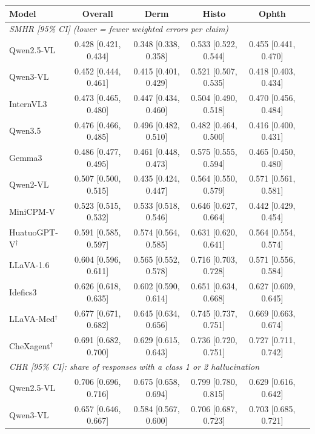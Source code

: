\begin{table}[t]
\centering
\scriptsize
\begin{tabular}{lccccc}
\toprule
Model & Overall & Derm & Histo & Ophth \\
\midrule
\multicolumn{5}{l}{\textit{SMHR [95\% CI] (lower = fewer weighted errors per claim)}} \\
\midrule
Qwen2.5-VL & 0.428 [0.421, 0.434] & 0.348 [0.338, 0.358] & 0.533 [0.522, 0.544] & 0.455 [0.441, 0.470] \\
Qwen3-VL & 0.452 [0.444, 0.461] & 0.415 [0.401, 0.429] & 0.521 [0.507, 0.535] & 0.418 [0.403, 0.434] \\
InternVL3 & 0.473 [0.465, 0.480] & 0.447 [0.434, 0.460] & 0.504 [0.490, 0.518] & 0.470 [0.456, 0.484] \\
Qwen3.5 & 0.476 [0.466, 0.485] & 0.496 [0.482, 0.510] & 0.482 [0.464, 0.500] & 0.416 [0.400, 0.431] \\
Gemma3 & 0.486 [0.477, 0.495] & 0.461 [0.448, 0.473] & 0.575 [0.555, 0.594] & 0.465 [0.450, 0.480] \\
Qwen2-VL & 0.507 [0.500, 0.515] & 0.435 [0.424, 0.447] & 0.564 [0.550, 0.579] & 0.571 [0.561, 0.581] \\
MiniCPM-V & 0.523 [0.515, 0.532] & 0.533 [0.518, 0.546] & 0.646 [0.627, 0.664] & 0.442 [0.429, 0.454] \\
HuatuoGPT-V$^{\dagger}$ & 0.591 [0.585, 0.597] & 0.574 [0.564, 0.585] & 0.631 [0.620, 0.641] & 0.564 [0.554, 0.574] \\
LLaVA-1.6 & 0.604 [0.596, 0.611] & 0.565 [0.552, 0.578] & 0.716 [0.703, 0.728] & 0.571 [0.556, 0.584] \\
Idefics3 & 0.626 [0.618, 0.635] & 0.602 [0.590, 0.614] & 0.651 [0.634, 0.668] & 0.627 [0.609, 0.645] \\
LLaVA-Med$^{\dagger}$ & 0.677 [0.671, 0.682] & 0.645 [0.634, 0.656] & 0.745 [0.737, 0.751] & 0.669 [0.663, 0.674] \\
CheXagent$^{\dagger}$ & 0.691 [0.682, 0.700] & 0.629 [0.615, 0.643] & 0.736 [0.720, 0.751] & 0.727 [0.711, 0.742] \\
\midrule
\multicolumn{5}{l}{\textit{CHR [95\% CI]: share of responses with a class 1 or 2 hallucination}} \\
\midrule
Qwen2.5-VL & 0.706 [0.696, 0.716] & 0.675 [0.658, 0.694] & 0.799 [0.780, 0.815] & 0.629 [0.616, 0.642] \\
Qwen3-VL & 0.657 [0.646, 0.667] & 0.584 [0.567, 0.600] & 0.706 [0.687, 0.723] & 0.703 [0.685, 0.721] \\

\end{tabular}
\end{table}
